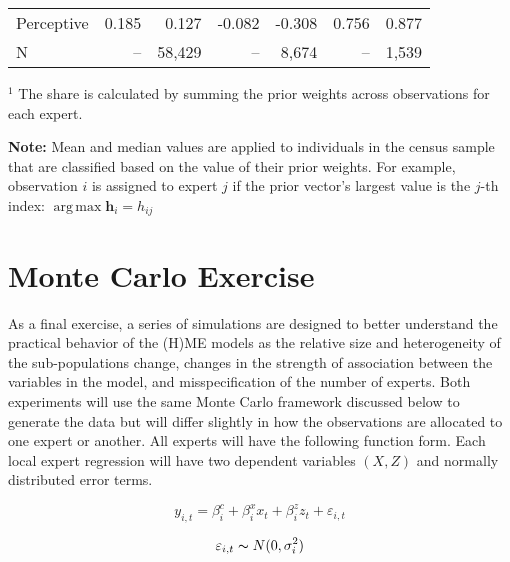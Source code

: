\documentclass[12pt]{article}
\DeclareMathOperator*{\argmax}{arg\,max}
\theoremstyle{definition}
\begin{document}
\begin{table}
\begin{threeparttable}
\begin{tabular}[l]{l r r r r r r}
      Perceptive            &   0.185 &   0.127 & -0.082 & -0.308 &   0.756 &   0.877 \\
      \cmidrule{1-7}
      N                     &      -- &  58,429 &     -- &  8,674 &      -- &   1,539 \\
      \hline
        \end{tabular}
        \begin{tablenotes}
          \item{\footnotesize $^{1}$ The share is calculated by summing the 
          prior weights across observations for each expert.}
          \item{\footnotesize \textbf{Note:} Mean and median values are applied to individuals in the census sample that are classified based on the value of their prior weights. For example, observation $i$ is assigned to expert $j$ if the prior vector's largest value is the $j$-th index: $\argmax \boldsymbol{h}_{i} = h_{ij}$}
        \end{tablenotes} \label{tbl:HME3_sample_comparison}
      \end{threeparttable}
    \end{table}
  

\clearpage


\section{Monte Carlo Exercise} \label{sec:MonteCarlo}

As a final exercise, a series of simulations are designed to better understand the practical behavior of the (H)ME models as the relative size and heterogeneity of the sub-populations change, changes in the strength of association between the variables in the model, and misspecification of the number of experts. Both experiments will use the same Monte Carlo framework discussed below to generate the data but will differ slightly in how the observations are allocated to one expert or another. All experts will have the following function form. Each local expert regression will have two dependent variables $(X, Z)$ and normally distributed error terms. 

\begin{equation} \label{eq:MC_regression_eq}
    y_{i,t} = \beta_{i}^{c} + \beta_{i}^{x}  x_{t} + \beta_{i}^{z}  z_{t} + \varepsilon_{i,t}
\end{equation}

\begin{equation} \label{eq:MC_regression_errors}
    \varepsilon_{i,t} \thicksim N(0, \sigma^{2}_{i})
\end{equation}
\end{document}
